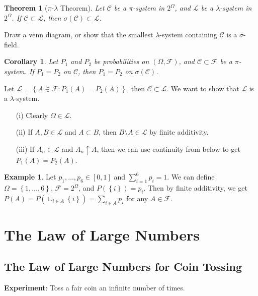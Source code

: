 \documentclass[11pt]{article}
\newtheorem{thm}{Theorem}[section]
\newtheorem{cor}{Corollary}[thm]
\theoremstyle{definition}
\newtheorem{example}{Example}[section]
\newcommand{\sm}[0]{\setminus}
\newcommand{\set}[1]{\left\{ #1 \right\}}
\newcommand{\m}[1]{\mathcal{#1}}
\begin{document}
\begin{thm}[$\pi$-$\lambda$ Theorem]
    Let $\m{C}$ be a $\pi$-system in $2^\Omega$, and $\m{L}$ be a $\lambda$-system in $2^\Omega$. If
    $\m{C}\subset\m{L}$, then $\sigma(\m{C})\subset\m{L}$.
\end{thm}
\proof
Draw a venn diagram, or show that the smallest $\lambda$-system containing $\m{C}$ is a
$\sigma$-field.
\qedhere


\begin{cor}
    Let $P_1$ and $P_2$ be probabilities on $(\Omega,\m{F})$, and $\m{C}\subset\m{F}$ be a
    $\pi$-system. If $P_1=P_2$ on $\m{C}$, then $P_1=P_2$ on $\sigma(\m{C})$.
\end{cor}
\proof
Let $\m{L} = \set{A\in\m{F}: P_1(A) = P_2(A)}$, then $\m{C}\subset\m{L}$. We want to show that
$\m{L}$ is a $\lambda$-system. 
\begin{enumerate}
    \item[(i)] Clearly $\Omega \in \m{L}$. 
    \item[(ii)] If $A,B\in\m{L}$ and $A\subset B$, then $B\sm A \in \m{L}$ by finite additivity.
    \item[(iii)] If $A_n\in\m{L}$ and $A_n\uparrow A$, then we can use continuity from below to get
        $P_1(A) = P_2(A)$. 
\qedhere
\end{enumerate}
\qedhere

\begin{example}
    Let $p_1,\dots,p_6 \in [0,1]$ and $\sum_{i=1}^6 p_i = 1$. We can define $\Omega =
    \set{1,\dots,6}$, $\m{F} = 2^\Omega$, and $P(\set{i}) = p_i$. Then by finite additivity, we get
    $P(A) = P(\dot\cup_{i\in A} \set{i}) = \sum_{i\in A} p_i$ for any $A\in\m{F}$.
\end{example}


\section{The Law of Large Numbers}

\subsection{The Law of Large Numbers for Coin Tossing}

\textbf{Experiment}: Toss a fair coin an infinite number of times.
\end{document}

